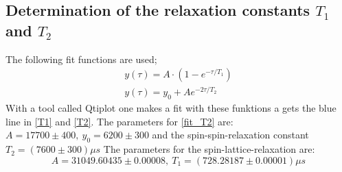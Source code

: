     \subsection{Determination of the relaxation constants $T_1$ and $T_2$}
     \label{task_4}
    The following fit functions are used;
    \begin{gather}
        y(\tau) = A\cdot(1-e^{-\tau/T_1})\label{fit_T1}\\
        y(\tau) = y_0 + Ae^{-2\tau/T_2}\label{fit_T2}
    \end{gather}
    With a tool called Qtiplot one makes a fit with these funktions a gets the blue line in \ref{T1} and \ref{T2}. The parameters for \ref{fit_T2} are: $A = 17700\pm400,\ y_0 = 6200\pm300$ and the spin-spin-relaxation constant $T_2 = (7600\pm300)\unit{\mu s}$
    The parameters for the spin-lattice-relaxation are:
    $$ A = 31049.60435\pm0.00008,\ T_1 = (728.28187\pm0.00001)\unit{\mu s} $$
 
